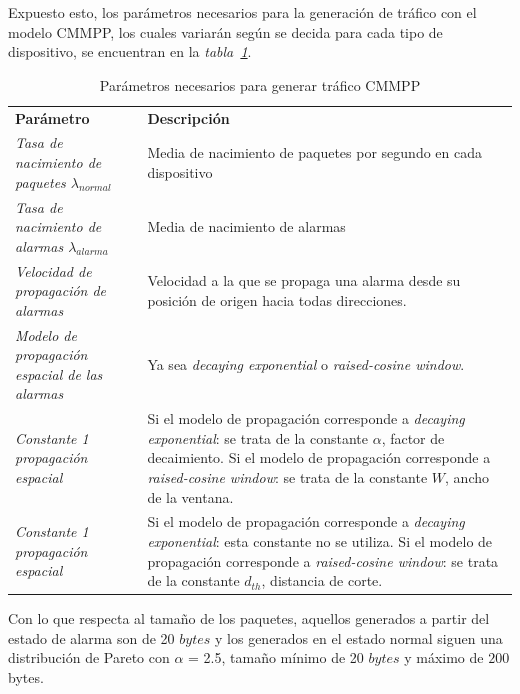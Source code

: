 Expuesto esto, los parámetros necesarios para la generación de tráfico con el modelo CMMPP, los cuales variarán según se decida para cada tipo de dispositivo, se encuentran en la \textit{tabla~\ref{tab:ParametrosTraficoCMMPP}}.\newline

\begin{table}
    \caption{Parámetros necesarios para generar tráfico CMMPP}
    \label{tab:ParametrosTraficoCMMPP}
    \centering
    \begin{tabular}{|m{6cm}|p{10cm}|} \\ 
    \textbf{Parámetro} & \textbf{Descripción} \\ 
    \textit{Tasa de nacimiento de paquetes $\lambda_{normal}$}  & \footnotesize{ Media de nacimiento de paquetes por segundo en cada dispositivo } \\ \hline 
    \textit{Tasa de nacimiento de alarmas $\lambda_{alarma}$}  & \footnotesize{ Media de nacimiento de alarmas } \\ \hline 
    \textit{Velocidad de propagación de alarmas}  & \footnotesize{ Velocidad a la que se propaga una alarma desde su posición de origen hacia todas direcciones. } \\ \hline 
    \textit{Modelo de propagación espacial de las alarmas} & \footnotesize{ Ya sea \textit{decaying exponential} o \textit{raised-cosine window}. } \\ \hline 
    \textit{Constante 1 propagación espacial} & \footnotesize{ Si el modelo de propagación corresponde a \textit{decaying exponential}:
    se trata de la constante $\alpha$, factor de decaimiento.
    Si el modelo de propagación corresponde a \textit{raised-cosine window}:
    se trata de la constante $W$, ancho de la ventana. } \\ \hline 
    \textit{Constante 1 propagación espacial} & \footnotesize{ Si el modelo de propagación corresponde a \textit{decaying exponential}:
    esta constante no se utiliza.
    Si el modelo de propagación corresponde a \textit{raised-cosine window}:
    se trata de la constante $d_{th}$, distancia de corte. } \\ \hline 
    \end{tabular}
\end{table}

    Con lo que respecta al tamaño de los paquetes, aquellos generados a partir del estado de alarma son de 20 $bytes$ y los generados en el estado normal siguen una distribución de Pareto con $\alpha$ = 2.5, tamaño mínimo de 20 $bytes$ y máximo de $200$ bytes.\newline

